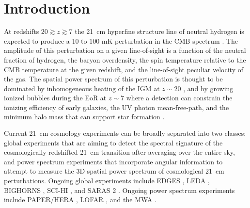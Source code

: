 \documentclass[twocolumn]{aastex61}
\begin{document}

\section{Introduction}

At redshifts $20 \gtrsim z \gtrsim 7$ the 21~cm hyperfine structure line of neutral hydrogen is
expected to produce a 10 to 100 mK perturbation in the CMB spectrum \citep{2006PhR...433..181F,
2012RPPh...75h6901P}. The amplitude of this perturbation on a given line-of-sight is a function of
the neutral fraction of hydrogen, the baryon overdensity, the spin temperature relative to the CMB
temperature at the given redshift, and the line-of-sight peculiar velocity of the gas.  The spatial
power spectrum of this perturbation is thought to be dominated by inhomogeneous heating of the IGM
at $z\sim 20$ \citep{2014MNRAS.437L..36F}, and by growing ionized bubbles during the EoR at $z\sim
7$ where a detection can constrain the ionizing efficiency of early galaxies, the UV photon
mean-free-path, and the minimum halo mass that can support star formation
\citep{2015MNRAS.449.4246G}.

Current 21~cm cosmology experiments can be broadly separated into two classes: global experiments
that are aiming to detect the spectral signature of the cosmologically redshifted 21~cm transition
after averaging over the entire sky, and power spectrum experiments that incorporate angular
information to attempt to measure the 3D spatial power spectrum of cosmological 21~cm perturbations.
Ongoing global experiments include EDGES \citep{2010Natur.468..796B, 2017ApJ...835...49M}, LEDA
\citep{todo_price_2017}, BIGHORNS \citep{2015PASA...32....4S}, SCI-HI \citep{2014ApJ...782L...9V},
and SARAS 2 \citep{2017arXiv170306647S}.  Ongoing power spectrum experiments include PAPER/HERA
\citep{2015ApJ...809...61A, 2016arXiv160607473D}, LOFAR \citep{2017ApJ...838...65P}, and the MWA
\citep{2016ApJ...833..102B, 2016MNRAS.460.4320E}.
\end{document}
